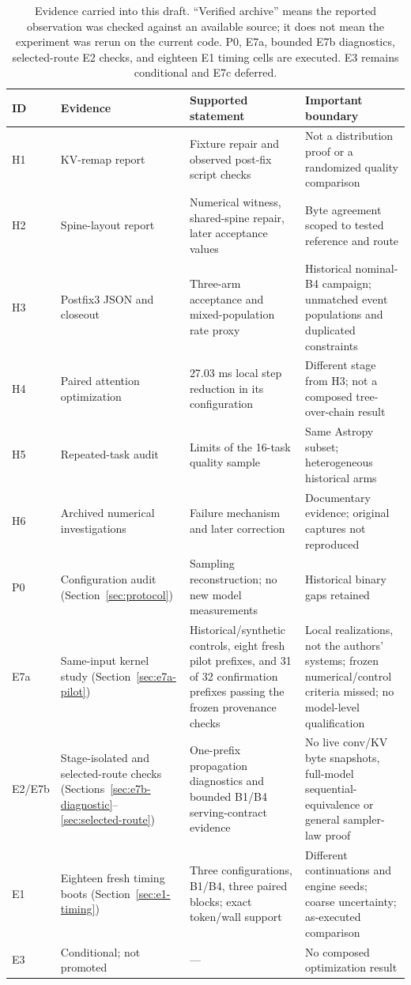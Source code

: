 \documentclass[conference]{IEEEtran}
\begin{document}
\begin{table}[t]
\caption{Evidence carried into this draft. ``Verified archive'' means the reported observation was checked against an available source; it does not mean the experiment was rerun on the current code. P0, E7a, bounded E7b diagnostics, selected-route E2 checks, and eighteen E1 timing cells are executed. E3 remains conditional and E7c deferred.}
\label{tab:evidence}
\centering\footnotesize
\begin{tabularx}{\textwidth}{@{}p{}p{}Yp{0.25\textwidth}@{}}
\toprule
ID & Evidence & Supported statement & Important boundary \\
\midrule
H1 & KV-remap report~\cite{lumo2026stateless} & Fixture repair and observed post-fix script checks & Not a distribution proof or a randomized quality comparison \\
H2 & Spine-layout report~\cite{lumo2026spine} & Numerical witness, shared-spine repair, later acceptance values & Byte agreement scoped to tested reference and route \\
H3 & Postfix3 JSON and closeout~\cite{lumo2026archive} & Three-arm acceptance and mixed-population rate proxy & Historical nominal-B4 campaign; unmatched event populations and duplicated constraints \\
H4 & Paired attention optimization~\cite{lumo2026paired} & 27.03 ms local step reduction in its configuration & Different stage from H3; not a composed tree-over-chain result \\
H5 & Repeated-task audit~\cite{lumo2026archive} & Limits of the 16-task quality sample & Same Astropy subset; heterogeneous historical arms \\
H6 & Archived numerical investigations & Failure mechanism and later correction & Documentary evidence; original captures not reproduced \\
P0 & Configuration audit (Section~\ref{sec:protocol}) & Sampling reconstruction; no new model measurements & Historical binary gaps retained \\
E7a & Same-input kernel study (Section~\ref{sec:e7a-pilot}) & Historical/synthetic controls, eight fresh pilot prefixes, and 31 of 32 confirmation prefixes passing the frozen provenance checks & Local realizations, not the authors' systems; frozen numerical/control criteria missed; no model-level qualification \\
E2/E7b & Stage-isolated and selected-route checks (Sections~\ref{sec:e7b-diagnostic}--\ref{sec:selected-route}) & One-prefix propagation diagnostics and bounded B1/B4 serving-contract evidence & No live conv/KV byte snapshots, full-model sequential-equivalence or general sampler-law proof \\
E1 & Eighteen fresh timing boots (Section~\ref{sec:e1-timing}) & Three configurations, B1/B4, three paired blocks; exact token/wall support & Different continuations and engine seeds; coarse uncertainty; as-executed comparison \\
E3 & Conditional; not promoted & --- & No composed optimization result \\
\bottomrule
\end{tabularx}
\end{table}
\end{document}
